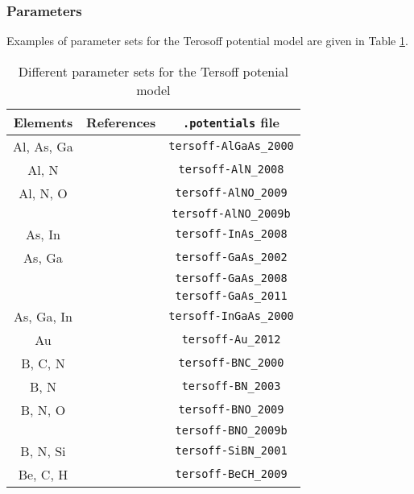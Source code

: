 \subsubsection{Parameters}
Examples of parameter sets for the Terosoff potential model are given in Table \ref{tab:Tersoff}.

\begin{table}
  \caption{Different parameter sets for the Tersoff potenial model}
  \label{tab:Tersoff}
  {\footnotesize
  \begin{center}
    \begin{tabular}{ccc}
      Elements & References & \texttt{.potentials} file \\\hline
      Al, As, Ga & \cite{nordlund2000strain} & \verb+tersoff-AlGaAs_2000+\\
      \hline
      Al, N & \cite{kioseoglou2008interatomic} & \verb+tersoff-AlN_2008+\\
      \hline
      Al, N, O & \cite{okeke2009molecular} & \verb+tersoff-AlNO_2009+\\
      & \cite{okeke2009molecular} & \verb+tersoff-AlNO_2009b+\\
      \hline
      As, In & \cite{hammerschmidt2008analytic} & \verb+tersoff-InAs_2008+\\
      \hline
      As, Ga & \cite{albe2002modeling} & \verb+tersoff-GaAs_2002+\\
             & \cite{hammerschmidt2008analytic} & \verb+tersoff-GaAs_2008+\\
             & \cite{fichthorn2011analytic} & \verb+tersoff-GaAs_2011+\\
      \hline
      As, Ga, In & \cite{nordlund2000strain} & \verb+tersoff-InGaAs_2000+\\
      \hline
      Au & \cite{backman2012bond}& \verb+tersoff-Au_2012+\\
      \hline
      B, C, N & \cite{matsunaga2000tersoff} & \verb+tersoff-BNC_2000+\\
      \hline
      B, N & \cite{moon2003molecular} &  \verb+tersoff-BN_2003+\\
      \hline
      B, N, O & \cite{okeke2009molecular} & \verb+tersoff-BNO_2009+\\
      & \cite{okeke2009molecular} & \verb+tersoff-BNO_2009b+\\
      \hline
      B, N, Si & \cite{matsunaga2001molecular} & \verb+tersoff-SiBN_2001+\\
      \hline
      Be, C, H & \cite{0953-8984-21-44-445002} & \verb+tersoff-BeCH_2009+\\

\end{tabular}
\end{center}}
\end{table}
